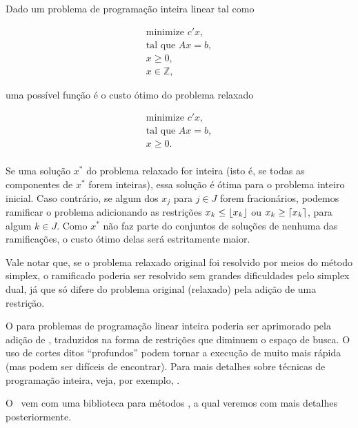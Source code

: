 \documentclass{article}
\begin{document}
Dado um problema de programação inteira linear tal como

\begin{equation}
  \begin{split}
    \text{minimize } c'x, \\ \text{tal que } Ax = b,\\ x \geq 0,\\ x
    \in \mathbb{Z},
  \end{split}\label{eq:inteiro}
\end{equation}

\noindent uma possível função  é o custo ótimo do problema
relaxado

\begin{equation}
  \begin{split}
    \text{minimize } c'x, \\ \text{tal que } Ax = b,\\ x \geq 0.\\
  \end{split}\label{eq:inteiro}
\end{equation}

Se uma solução $x^*$ do problema relaxado for inteira (isto é, se
todas as componentes de $x^*$ forem inteiras), essa solução é ótima
para o problema inteiro inicial. Caso contrário, se algum dos $x_j$
para $j \in J$ forem fracionários, podemos ramificar o problema
adicionando as restrições $x_k \leq \floor*{x_k}$ ou $x_k \geq
\ceil*{x_k}$, para algum $k \in J$. Como $x^*$ não faz parte do
conjuntos de soluções de nenhuma das ramificações, o custo ótimo delas
será estritamente maior.

Vale notar que, se o problema relaxado original foi resolvido por
meios do método simplex, o ramificado poderia ser resolvido sem
grandes dificuldades pelo simplex dual, já que só difere do problema
original (relaxado) pela adição de uma restrição.

O  para problemas de programação linear
inteira poderia ser aprimorado pela adição de , traduzidos na forma de restrições que diminuem o espaço de
busca. O uso de cortes ditos ``profundos'' podem tornar a execução de
 muito mais rápida (mas podem ser difíceis
de encontrar). Para mais detalhes sobre técnicas de programação
inteira, veja, por exemplo, \cite{tsitsiklis}.

O \eclipse\ vem com uma biblioteca para métodos , a qual veremos com mais detalhes posteriormente.
\end{document}
